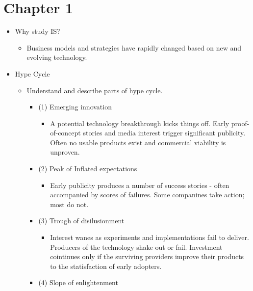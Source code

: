 \documentclass{report}
\begin{document}
\chapter*{Chapter 1}
\begin{itemize}
    \item Why study IS?
        \begin{itemize}[label=$\circ$]
            \item Business models and strategies have rapidly changed based on new and evolving technology.
        \end{itemize}
    \item Hype Cycle
        \begin{itemize}[label=$\circ$]
            \item Understand and describe parts of hype cycle.
                \begin{itemize}[label=$\circ$]
                    \item (1) Emerging innovation 
                        \begin{itemize}[label=$\circ$]
                            \item A potential technology breakthrough kicks things off. Early proof-of-concept stories and media interest trigger significant publicity. Often no usable products exist and commercial viability is unproven.
                        \end{itemize}
                    \item (2) Peak of Inflated expectations
                        \begin{itemize}[label=$\circ$]
                            \item  Early publicity produces a number of success stories - often accompanied by scores of failures. Some companines take action; most do not.
                        \end{itemize}
                    \item (3) Trough of disilusionment
                        \begin{itemize}[label=$\circ$]
                            \item Interest wanes as experiments and implementations fail to deliver. Producers of the technology shake out or fail. Investment cointinues only if the surviving providers improve their products to the statisfaction of early adopters.
                        \end{itemize}
                    \item (4) Slope of enlightenment

\end{itemize}
\end{itemize}
\end{itemize}
\end{document}
